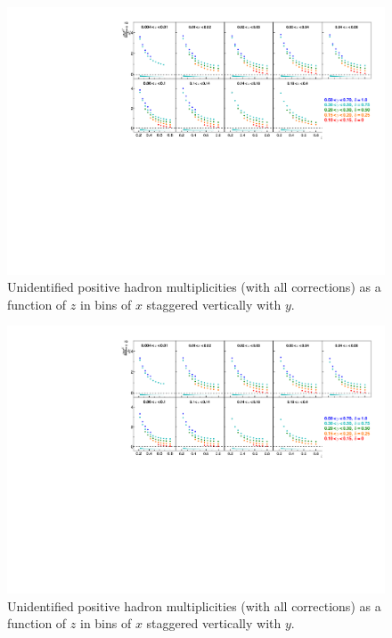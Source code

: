 \begin{figure}[!h]
  \centering
	\includegraphics[scale=0.85]{./gfx/hp.pdf}
	\caption{Unidentified positive hadron multiplicities (with all corrections) as a function of $z$ in bins of $x$ staggered vertically with $y$.}
	\label{pic:mhp}
\end{figure}

\newpage

\begin{figure}[!h]
  \centering
	\includegraphics[scale=0.85]{./gfx/hm.pdf}
	\caption{Unidentified positive hadron multiplicities (with all corrections) as a function of $z$ in bins of $x$ staggered vertically with $y$.}
	\label{pic:mhm}
\end{figure}

